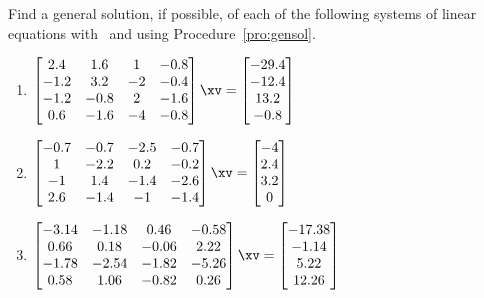 \begin{exercise} \label{ex:} 
Find a general solution, if possible, of each of the following systems of linear equations with \script\ and using Procedure~\ref{pro:gensol}.
\begin{enumerate}
\itemsep=3ex %
\item \(\begin{bmatrix} 2.4&1.6&1&-0.8
\\-1.2&3.2&-2&-0.4
\\-1.2&-0.8&2&-1.6
\\0.6&-1.6&-4&-0.8 \end{bmatrix}\xv
=\begin{bmatrix} -29.4
\\-12.4
\\13.2
\\-0.8 \end{bmatrix}\)
\setbox\ajrqrbox\hbox{}%
\marginpar{\usebox{\ajrqrbox\\[2ex]}}%


\item \(\begin{bmatrix} -0.7&-0.7&-2.5&-0.7
\\1&-2.2&0.2&-0.2
\\-1&1.4&-1.4&-2.6
\\2.6&-1.4&-1&-1.4 \end{bmatrix}\xv
=\begin{bmatrix} -4
\\2.4
\\3.2
\\0 \end{bmatrix}\)
\setbox\ajrqrbox\hbox{}%
\marginpar{\usebox{\ajrqrbox\\[2ex]}}%


\item \(\begin{bmatrix} -3.14&-1.18&0.46&-0.58
\\0.66&0.18&-0.06&2.22
\\-1.78&-2.54&-1.82&-5.26
\\0.58&1.06&-0.82&0.26 \end{bmatrix}\xv
=\begin{bmatrix} -17.38
\\-1.14
\\5.22
\\12.26 \end{bmatrix}\)
\setbox\ajrqrbox\hbox{}%
\marginpar{\usebox{\ajrqrbox\\[2ex]}}%



\end{enumerate}
\end{exercise}

